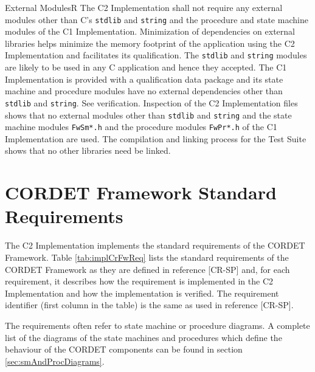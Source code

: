 \documentclass{pnp_article}
\begin{document}
\begin{fwReq}{External Modules}{R}
{The C2 Implementation shall not require any external modules other than C's \texttt{stdlib} and \texttt{string} and the procedure and state machine modules of the C1 Implementation.}
{Minimization of dependencies on external libraries helps minimize the memory footprint of the application using the C2 Implementation and facilitates its qualification. The \texttt{stdlib} and \texttt{string} modules are likely to be used in any C application and hence they accepted. The C1 Implementation is provided with a qualification data package and its state machine and procedure modules have no external dependencies other than \texttt{stdlib} and \texttt{string}.}
{See verification.} 
{Inspection of the C2 Implementation files shows that no external modules other than \texttt{stdlib} and \texttt{string} and the state machine modules \texttt{FwSm*.h} and the procedure modules \texttt{FwPr*.h} of the C1 Implementation are used. The compilation and linking process for the Test Suite shows that no other libraries need be linked. }
\end{fwReq}



\appendix
\section{CORDET Framework Standard Requirements}\label{sec:implCrFwReq}
The C2 Implementation implements the standard requirements of the CORDET Framework. 
Table \ref{tab:implCrFwReq} lists the standard requirements of the CORDET Framework as they are defined in reference [CR-SP] and, for each requirement, it describes how the requirement is implemented in the C2 Implementation and how the implementation is verified. The requirement identifier (first column in the table) is the same as used in reference [CR-SP].

The requirements often refer to state machine or procedure diagrams. A complete list of the diagrams of the state machines and procedures which define the behaviour of the CORDET components can be found in section \ref{sec:smAndProcDiagrams}.
\end{document}
